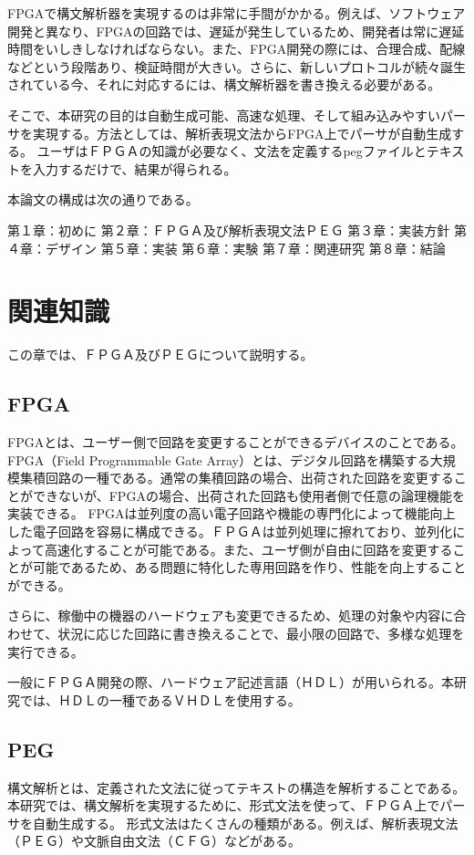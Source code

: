 \documentclass[12pt,oneside]{report}
\begin{document}
FPGAで構文解析器を実現するのは非常に手間がかかる。例えば、ソフトウェア開発と異なり、FPGAの回路では、遅延が発生しているため、開発者は常に遅延時間をいしきしなければならない。また、FPGA開発の際には、合理合成、配線などという段階あり、検証時間が大きい。さらに、新しいプロトコルが続々誕生されている今、それに対応するには、構文解析器を書き換える必要がある。

そこで、本研究の目的は自動生成可能、高速な処理、そして組み込みやすいパーサを実現する。方法としては、解析表現文法からFPGA上でパーサが自動生成する。
ユーザはＦＰＧＡの知識が必要なく、文法を定義するpegファイルとテキストを入力するだけで、結果が得られる。



本論文の構成は次の通りである。

第１章：初めに
第２章：ＦＰＧＡ及び解析表現文法ＰＥＧ
第３章：実装方針
第４章：デザイン
第５章：実装
第６章：実験
第７章：関連研究
第８章：結論


\chapter{関連知識}
この章では、ＦＰＧＡ及びＰＥＧについて説明する。

\section{FPGA}
FPGAとは、ユーザー側で回路を変更することができるデバイスのことである。
FPGA（Field Programmable Gate Array）とは、デジタル回路を構築する大規模集積回路の一種である。通常の集積回路の場合、出荷された回路を変更することができないが、FPGAの場合、出荷された回路も使用者側で任意の論理機能を実装できる。
FPGAは並列度の高い電子回路や機能の専門化によって機能向上した電子回路を容易に構成できる。ＦＰＧＡは並列処理に擦れており、並列化によって高速化することが可能である。また、ユーザ側が自由に回路を変更することが可能であるため、ある問題に特化した専用回路を作り、性能を向上することができる。

さらに、稼働中の機器のハードウェアも変更できるため、処理の対象や内容に合わせて、状況に応じた回路に書き換えることで、最小限の回路で、多様な処理を実行できる。

一般にＦＰＧＡ開発の際、ハードウェア記述言語（ＨＤＬ）が用いられる。本研究では、ＨＤＬの一種であるＶＨＤＬを使用する。

\section{PEG}
構文解析とは、定義された文法に従ってテキストの構造を解析することである。本研究では、構文解析を実現するために、形式文法を使って、ＦＰＧＡ上でパーサを自動生成する。
形式文法はたくさんの種類がある。例えば、解析表現文法（ＰＥＧ）や文脈自由文法（ＣＦＧ）などがある。
\end{document}
